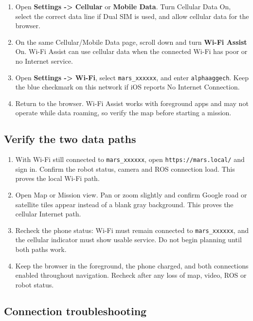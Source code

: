 \documentclass[
  10pt,
  letterpaper,
  openany]{report}
\providecommand{\tightlist}{%
  \setlength{\itemsep}{0pt}\setlength{\parskip}{0pt}}
\begin{document}
\begin{enumerate}
\tightlist
\item
  Open \textbf{Settings -\textgreater{} Cellular} or \textbf{Mobile
  Data}. Turn Cellular Data On, select the correct data line if Dual SIM
  is used, and allow cellular data for the browser.
\item
  On the same Cellular/Mobile Data page, scroll down and turn
  \textbf{Wi-Fi Assist} On. Wi-Fi Assist can use cellular data when the
  connected Wi-Fi has poor or no Internet service.
\item
  Open \textbf{Settings -\textgreater{} Wi-Fi}, select
  \texttt{mars\_xxxxxx}, and enter \texttt{alphaaggech}. Keep the blue
  checkmark on this network if iOS reports No Internet Connection.
\item
  Return to the browser. Wi-Fi Assist works with foreground apps and may
  not operate while data roaming, so verify the map before starting a
  mission.
\end{enumerate}

\subsection{Verify the two data paths}\label{verify-the-two-data-paths}

\begin{enumerate}
\tightlist
\item
  With Wi-Fi still connected to \texttt{mars\_xxxxxx}, open
  \texttt{https://mars.local/} and sign in. Confirm the robot status,
  camera and ROS connection load. This proves the local Wi-Fi path.
\item
  Open Map or Mission view. Pan or zoom slightly and confirm Google road
  or satellite tiles appear instead of a blank gray background. This
  proves the cellular Internet path.
\item
  Recheck the phone status: Wi-Fi must remain connected to
  \texttt{mars\_xxxxxx}, and the cellular indicator must show usable
  service. Do not begin planning until both paths work.
\item
  Keep the browser in the foreground, the phone charged, and both
  connections enabled throughout navigation. Recheck after any loss of
  map, video, ROS or robot status.
\end{enumerate}

\subsection{Connection
troubleshooting}\label{connection-troubleshooting}
\end{document}
